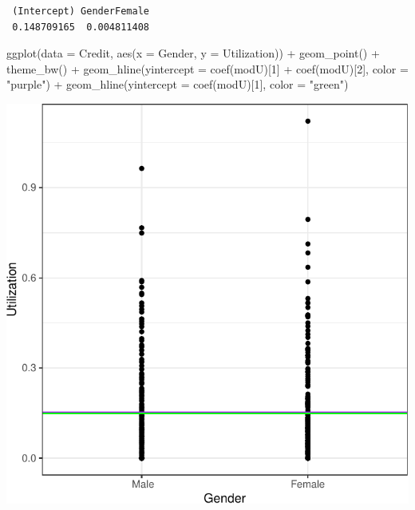 \documentclass[
]{article}
\newenvironment{Shaded}{\begin{snugshade}}{\end{snugshade}}
\newcommand{\AttributeTok}[1]{\textcolor[rgb]{0.77,0.63,0.00}{#1}}
\newcommand{\DecValTok}[1]{\textcolor[rgb]{0.00,0.00,0.81}{#1}}
\newcommand{\FunctionTok}[1]{\textcolor[rgb]{0.00,0.00,0.00}{#1}}
\newcommand{\NormalTok}[1]{#1}
\newcommand{\SpecialCharTok}[1]{\textcolor[rgb]{0.00,0.00,0.00}{#1}}
\newcommand{\StringTok}[1]{\textcolor[rgb]{0.31,0.60,0.02}{#1}}
\begin{document}
\begin{verbatim}
 (Intercept) GenderFemale 
 0.148709165  0.004811408 
\end{verbatim}

\begin{Shaded}
\begin{Highlighting}[]
\FunctionTok{ggplot}\NormalTok{(}\AttributeTok{data =}\NormalTok{ Credit, }\FunctionTok{aes}\NormalTok{(}\AttributeTok{x =}\NormalTok{ Gender, }\AttributeTok{y =}\NormalTok{ Utilization)) }\SpecialCharTok{+} 
  \FunctionTok{geom\_point}\NormalTok{() }\SpecialCharTok{+} 
  \FunctionTok{theme\_bw}\NormalTok{() }\SpecialCharTok{+} 
  \FunctionTok{geom\_hline}\NormalTok{(}\AttributeTok{yintercept =} \FunctionTok{coef}\NormalTok{(modU)[}\DecValTok{1}\NormalTok{] }\SpecialCharTok{+} \FunctionTok{coef}\NormalTok{(modU)[}\DecValTok{2}\NormalTok{], }\AttributeTok{color =} \StringTok{"purple"}\NormalTok{) }\SpecialCharTok{+} 
  \FunctionTok{geom\_hline}\NormalTok{(}\AttributeTok{yintercept =} \FunctionTok{coef}\NormalTok{(modU)[}\DecValTok{1}\NormalTok{], }\AttributeTok{color =} \StringTok{"green"}\NormalTok{)}
\end{Highlighting}
\end{Shaded}

\begin{center}\includegraphics{SDM-CHAP24_files/figure-latex/UTIL-1} \end{center}
\end{document}

